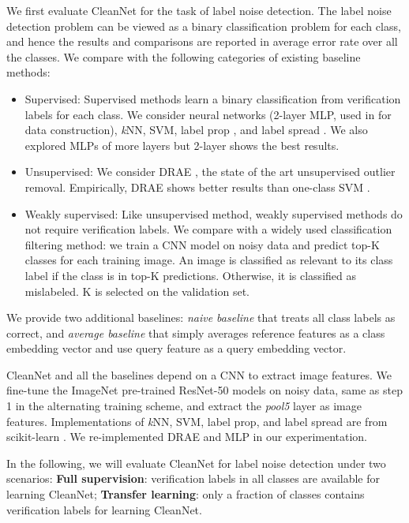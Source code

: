 \documentclass[10pt,twocolumn,letterpaper]{article}
\begin{document}
We first evaluate CleanNet for the task of label noise detection. The label noise detection problem can be viewed as a binary classification problem for each class, and hence the results and comparisons are reported in average error rate over all the classes. We compare with the following categories of existing baseline methods:
\begin{itemize}
\setlength\itemsep{0em}
\item Supervised: Supervised methods learn a binary classification from verification labels for each class. We consider neural networks (2-layer MLP, used in \cite{yu2015lsun} for data construction), \textit{k}NN, SVM, label prop \cite{zhu2002learning}, and label spread \cite{zhou2004learning}. We also explored MLPs of more layers but 2-layer shows the best results.
\item Unsupervised: We consider DRAE \cite{xia2015learning}, the state of the art unsupervised outlier removal. Empirically, DRAE shows better results than one-class SVM \cite{scholkopf2001estimating}.
\item Weakly supervised: Like unsupervised method, weakly supervised methods do not require verification labels. We compare with a widely used classification filtering method: we train a CNN model on noisy data and predict top-K classes for each training image. An image is classified as relevant to its class label if the class is in top-K predictions. Otherwise, it is classified as mislabeled. K is selected on the validation set.
\end{itemize}

We provide two additional baselines: \textit{naive baseline} that treats all class labels as correct, and \textit{average baseline} that simply averages reference features as a class embedding vector and use query feature as a query embedding vector.

CleanNet and all the baselines depend on a CNN to extract image features. We fine-tune the ImageNet pre-trained ResNet-50 models \cite{he2016deep} on noisy data, same as step 1 in the alternating training scheme, and extract the \textit{pool5} layer as image features. Implementations of \textit{k}NN, SVM, label prop, and label spread are from scikit-learn \cite{pedregosa2011scikit}. We re-implemented DRAE and MLP in our experimentation.

In the following, we will evaluate CleanNet for label noise detection under two scenarios: \textbf{Full supervision}: verification labels in all classes are available for learning CleanNet; \textbf{Transfer learning}: only a fraction of classes contains verification labels for learning CleanNet.
\end{document}

